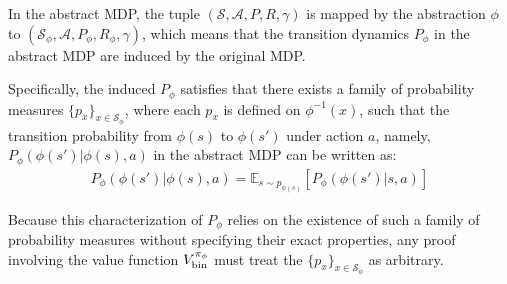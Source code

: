 \documentclass[twoside]{article}
\newcommand{\CAL}[1]{\mathcal{#1}}
\begin{document}
In the abstract MDP, the tuple $(\CAL{S}, \CAL{A}, P, R, \gamma)$ is mapped by the abstraction $\phi$ to $(\CAL{S}_\phi, \CAL{A}, P_\phi, R_\phi, \gamma)$, which means that the transition dynamics $P_\phi$ in the abstract MDP are induced by the original MDP.

Specifically, the induced $P_\phi$ satisfies that there exists a family of probability measures $\{p_x\}_{x\in\CAL{S}_\phi}$, where each $p_x$ is defined on $\phi^{-1}(x)$, such that the transition probability from $\phi(s)$ to $\phi(s')$ under action $a$, namely, $P_\phi(\phi(s')|\phi(s),a)$ in the abstract MDP can be written as: \begin{align}\label{equ:3-26}P_\phi(\phi(s')|\phi(s),a)=\mathbb{E}_{s\sim p_{\phi(s)}}[P_\phi(\phi(s')|s,a)] \end{align}

Because this characterization of $P_\phi$ relies on the existence of such a family of probability measures without specifying their exact properties, any proof involving the value function ${V}_{{\rm bin}}^{\pi_\phi}$ must treat the $\{p_x\}_{x\in\CAL{S}_\phi}$ as arbitrary.
\end{document}
